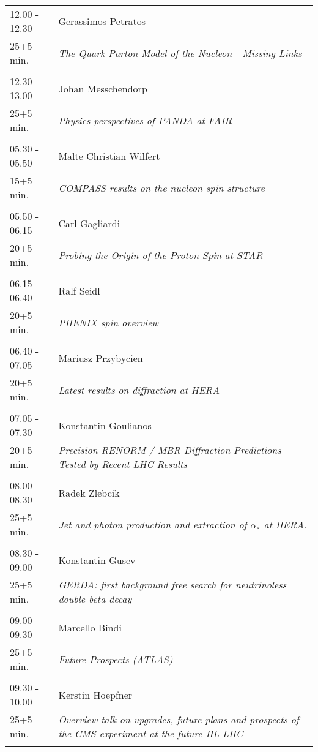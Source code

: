 \begin{longtable}{p{3cm}p{13cm}}
12.00 - 12.30 & Gerassimos Petratos\\ 
25+5 min. & {\it The Quark Parton Model of the Nucleon - Missing Links}\\ 
 & \\ 
12.30 - 13.00 & Johan Messchendorp\\ 
25+5 min. & {\it Physics perspectives of PANDA at FAIR}\\ 
 & \\ 
05.30 - 05.50 & Malte Christian Wilfert\\ 
15+5 min. & {\it COMPASS results on the nucleon spin structure}\\ 
 & \\ 
05.50 - 06.15 & Carl Gagliardi\\ 
20+5 min. & {\it Probing the Origin of the Proton Spin at STAR}\\ 
 & \\ 
06.15 - 06.40 & Ralf Seidl\\ 
20+5 min. & {\it PHENIX spin overview}\\ 
 & \\ 
06.40 - 07.05 & Mariusz Przybycien\\ 
20+5 min. & {\it Latest results on diffraction at HERA}\\ 
 & \\ 
07.05 - 07.30 & Konstantin Goulianos\\ 
20+5 min. & {\it Precision RENORM / MBR Diffraction Predictions Tested by Recent LHC Results}\\ 
 & \\ 
08.00 - 08.30 & Radek Zlebcik\\ 
25+5 min. & {\it Jet and photon production and extraction of $\alpha_s$ at HERA.}\\ 
 & \\ 
08.30 - 09.00 & Konstantin Gusev\\ 
25+5 min. & {\it GERDA: first background free search for neutrinoless double beta decay}\\ 
 & \\ 
09.00 - 09.30 & Marcello Bindi\\ 
25+5 min. & {\it Future Prospects (ATLAS)}\\ 
 & \\ 
09.30 - 10.00 & Kerstin Hoepfner\\ 
25+5 min. & {\it Overview talk on upgrades, future plans and prospects of the CMS experiment at the future HL-LHC}\\ 
 & \\ 

\end{longtable}
